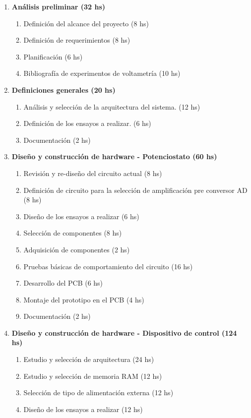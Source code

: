 \documentclass[11pt]{charter}
\begin{document}
\begin{enumerate}
\item \textbf{Análisis preliminar (32 hs)} 
	\begin{enumerate}
		\item Definición del alcance del proyecto (8 hs)
		\item Definición de requerimientos (8 hs)
		\item Planificación (6 hs)
		\item Bibliografía de experimentos de voltametría (10 hs)
	\end{enumerate}
\item \textbf{Definiciones generales (20 hs)}
	\begin{enumerate}
		\item Análisis y selección de la arquitectura del sistema. (12 hs)
		\item Definición de los ensayos a realizar. (6 hs)
		\item Documentación (2 hs)
	\end{enumerate}
\item \textbf{Diseño y construcción de hardware - Potenciostato (60 hs)}
	\begin{enumerate}
		\item Revisión y re-diseño del circuito actual (8 hs)
		\item Definición de circuito para la selección de amplificación pre conversor AD (8 hs)
		\item Diseño de los ensayos a realizar (6 hs)
		\item Selección de componentes (8 hs)
		\item Adquisición de componentes (2 hs)
		\item Pruebas básicas de comportamiento del circuito (16 hs)
		\item Desarrollo del PCB (6 hs)
		\item Montaje del prototipo en el PCB (4 hs)
		\item Documentación (2 hs)
	\end{enumerate}
\item \textbf{Diseño y construcción de hardware - Dispositivo de control (124 hs)}
	\begin{enumerate}
		\item Estudio y selección de arquitectura (24 hs)
		\item Estudio y selección de memoria RAM (12 hs)
		\item Selección de tipo de alimentación externa (12 hs)
		\item Diseño de los ensayos a realizar (12 hs)

\end{enumerate}
\end{enumerate}
\end{document}

